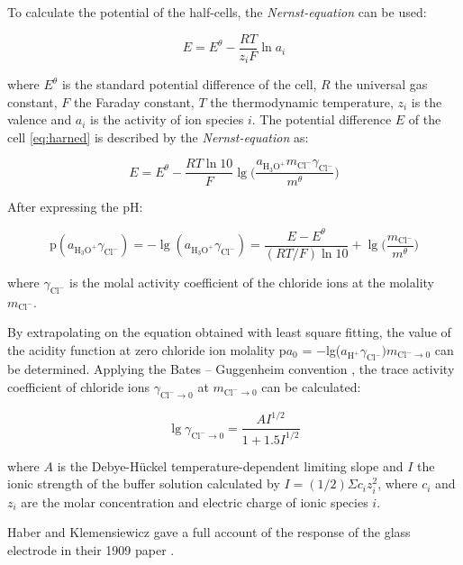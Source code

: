 \documentclass[manuscript=article, journal=jceda8]{achemso}
\begin{document}
To calculate the potential of the half-cells, the \emph{Nernst-equation} can be used:

\begin{equation}
E = E^\theta - \frac{RT}{z_iF}\ln a_i
\end{equation}

where $E^\theta$ is the standard potential difference of the cell, $R$ the universal gas constant, $F$ the Faraday constant, $T$ the thermodynamic temperature, $z_i$ is the valence and $a_i$ is the activity of ion species $i$.
The potential difference $E$ of the cell \ref{eq:harned} is described by the \emph{Nernst-equation} as:

\begin{equation}
E = E^\theta - \frac{RT\ln 10}{F}\lg\bigg(\frac{a_{\textrm{H}_3\textrm{O}^+}m_{\textrm{Cl}^-}\gamma_{\textrm{Cl}^-}}{m^\theta}\bigg)
\end{equation}

After expressing the pH:

\begin{equation}
\textrm{p}(a_{\textrm{H}_3\textrm{O}^+}\gamma_{\textrm{Cl}^-}) = -\lg(a_{\textrm{H}_3\textrm{O}^+}\gamma_{\textrm{Cl}^-}) = \frac{E - E^\theta}{(RT/F)\ln10} + \lg \bigg(\frac{m_{\textrm{Cl}^-}}{m^\theta}\bigg)
\end{equation}

where $\gamma_{\textrm{Cl}^-}$ is the molal activity coefficient of the chloride ions at the molality $m_{\textrm{Cl}^-}$.

By extrapolating on the equation obtained with least square fitting, the value of the acidity function at zero chloride ion molality p$a_0$ = $-$lg($a_{\textrm{H}^+} \gamma _{\textrm{Cl}^-})m_{\textrm{Cl}^- \to 0}$ can be determined.
Applying the Bates -- Guggenheim convention \cite{bates1960report}, the trace activity coefficient of chloride ions $\gamma_{\textrm{Cl}^- \to 0}$ at $m_{\textrm{Cl}^- \to 0}$ can be calculated:

\begin{equation}
\lg \gamma_{\textrm{Cl}^- \to 0} = \frac{A I^{1/2}}{1 + 1.5I^{1/2}}
\end{equation}

where $A$ is the Debye-Hückel temperature-dependent limiting slope and $I$ the ionic strength of the buffer solution calculated by $I = (1/2) \Sigma c_i z_{i}^{2}$, where $c_i$ and $z_i$ are the molar concentration and electric charge of ionic species $i$.

Haber and Klemensiewicz gave a full account of the response of the glass electrode in their 1909 paper \cite{haber1909elektrische, haber1909concerning}.
\end{document}
